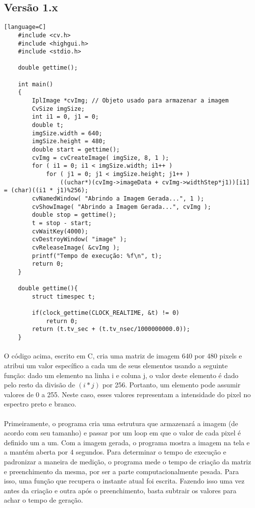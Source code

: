 \documentclass{article}
\begin{document}
	\subsection{Versão 1.x} %
	\label{sub:versao_1_x}
	\begin{verbatim}[language=C]
	#include <cv.h>
	#include <highgui.h>
	#include <stdio.h>

	double gettime();

	int main()
	{
  		IplImage *cvImg; // Objeto usado para armazenar a imagem
  		CvSize imgSize; 
  		int i1 = 0, j1 = 0;
  		double t;
  		imgSize.width = 640; 
  		imgSize.height = 480;  
  		double start = gettime();
  		cvImg = cvCreateImage( imgSize, 8, 1 );
  		for ( i1 = 0; i1 < imgSize.width; i1++ )
    		for ( j1 = 0; j1 < imgSize.height; j1++ )
  				((uchar*)(cvImg->imageData + cvImg->widthStep*j1))[i1] = (char)((i1 * j1)%256);
  		cvNamedWindow( "Abrindo a Imagem Gerada...", 1 );
  		cvShowImage( "Abrindo a Imagem Gerada...", cvImg );
  		double stop = gettime();
  		t = stop - start;
  		cvWaitKey(4000);
  		cvDestroyWindow( "image" );
  		cvReleaseImage( &cvImg );
  		printf("Tempo de execução: %f\n", t);
  		return 0;
	}

	double gettime(){
		struct timespec t;

		if(clock_gettime(CLOCK_REALTIME, &t) != 0)
			return 0;
		return (t.tv_sec + (t.tv_nsec/1000000000.0));
	}
	\end{verbatim}

	\paragraph{}
	O código acima, escrito em C, cria uma matriz de imagem 640 por 480 pixels e atribui um valor específico a cada um de seus elementos usando a seguinte função: dado um elemento na linha i e coluna j, o valor deste elemento é dado pelo resto da divisão de $(i*j)$ por 256. Portanto, um elemento pode assumir valores de 0 a 255. Neste caso, esses valores representam a intensidade do pixel no espectro preto e branco.
	\paragraph{}
	Primeiramente, o programa cria uma estrutura que armazenará a imagem (de acordo com seu tamanho) e passar por um loop em que o valor de cada pixel é definido um a um. Com a imagem gerada, o programa mostra a imagem na tela e a mantém aberta por 4 segundos. Para determinar o tempo de execução e padronizar a maneira de medição, o programa mede o tempo de criação da matriz e preenchimento da mesma, por ser a parte computacionalmente pesada. Para isso, uma função que recupera o instante atual foi escrita. Fazendo isso uma vez antes da criação e outra após o preenchimento, basta subtrair os valores para achar o tempo de geração.
\end{document}
